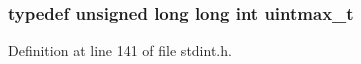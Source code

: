\subsubsection[{\texorpdfstring{uintmax\+\_\+t}{uintmax_t}}]{ typedef unsigned long long {\bf int} {\bf uintmax\+\_\+t}}\hypertarget{win_2_l_a_d_s_p_a__plugins-win_2glibc__includes_2stdint_8h_a8a33366af062ae1b08dd12d95c5e6692}{}\label{win_2_l_a_d_s_p_a__plugins-win_2glibc__includes_2stdint_8h_a8a33366af062ae1b08dd12d95c5e6692}


Definition at line 141 of file stdint.\+h.

